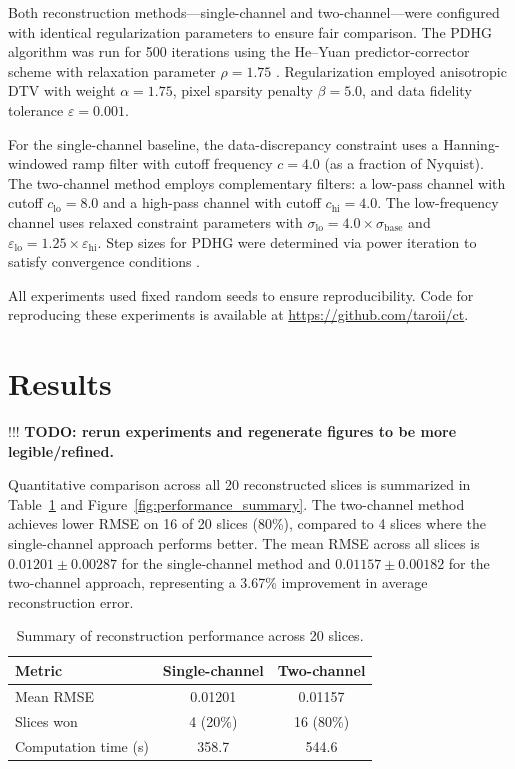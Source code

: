\documentclass[journal, a4paper]{IEEEtran}
\begin{document}
Both reconstruction methods---single-channel and two-channel---were configured with identical regularization parameters to ensure fair comparison. The PDHG algorithm was run for 500 iterations using the He--Yuan predictor-corrector scheme with relaxation parameter $\rho = 1.75$ \cite{he2012convergence}. Regularization employed anisotropic DTV with weight $\alpha = 1.75$, pixel sparsity penalty $\beta = 5.0$, and data fidelity tolerance $\varepsilon = 0.001$.

For the single-channel baseline, the data-discrepancy constraint uses a Hanning-windowed ramp filter with cutoff frequency $c = 4.0$ (as a fraction of Nyquist). The two-channel method employs complementary filters: a low-pass channel with cutoff $c_{\mathrm{lo}} = 8.0$ and a high-pass channel with cutoff $c_{\mathrm{hi}} = 4.0$. The low-frequency channel uses relaxed constraint parameters with $\sigma_{\mathrm{lo}} = 4.0 \times \sigma_{\mathrm{base}}$ and $\varepsilon_{\mathrm{lo}} = 1.25 \times \varepsilon_{\mathrm{hi}}$. Step sizes for PDHG were determined via power iteration to satisfy convergence conditions \cite{chambolle2011first}.

All experiments used fixed random seeds to ensure reproducibility. Code for reproducing these experiments is available at \url{https://github.com/taroii/ct}.

\section{Results}

!!! \textbf{TODO: rerun experiments and regenerate figures to be more legible/refined.} 

Quantitative comparison across all 20 reconstructed slices is summarized in Table~\ref{tab:summary} and Figure~\ref{fig:performance_summary}. The two-channel method achieves lower RMSE on 16 of 20 slices (80\%), compared to 4 slices where the single-channel approach performs better. The mean RMSE across all slices is $0.01201 \pm 0.00287$ for the single-channel method and $0.01157 \pm 0.00182$ for the two-channel approach, representing a 3.67\% improvement in average reconstruction error.

\begin{table}[h]
\centering
\caption{Summary of reconstruction performance across 20 slices.}
\label{tab:summary}
\begin{tabular}{lcc}
\toprule
Metric & Single-channel & Two-channel \\
\midrule
Mean RMSE & 0.01201 & 0.01157 \\
Slices won & 4 (20\%) & 16 (80\%) \\
Computation time (s) & 358.7 & 544.6 \\
\bottomrule
\end{tabular}
\end{table}
\end{document}
